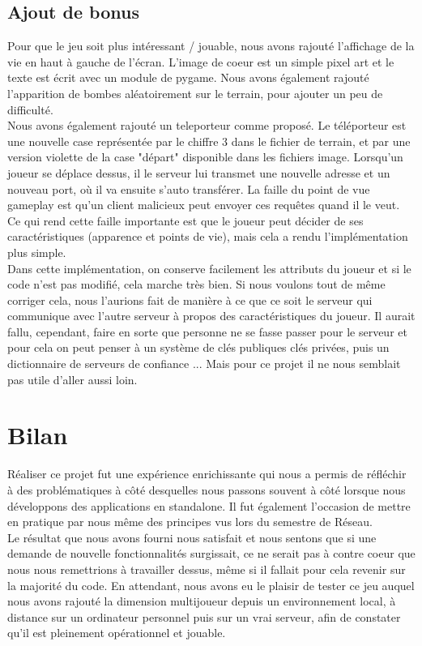 \documentclass[12pt]{article}
\begin{document}
\subsection{Ajout de bonus}
Pour que le jeu soit plus intéressant / jouable, nous avons rajouté l'affichage de la vie en haut à gauche de l'écran. L'image de coeur est un simple pixel art et le texte est écrit avec un module de pygame. Nous avons également rajouté l'apparition de bombes aléatoirement sur le terrain, pour ajouter un peu de difficulté. 
\\

Nous avons également rajouté un teleporteur comme proposé. Le téléporteur est une nouvelle case représentée par le chiffre 3 dans le fichier de terrain, et par une version violette de la case "départ" disponible dans les fichiers image. Lorsqu'un joueur se déplace dessus, il le serveur lui transmet une nouvelle adresse et un nouveau port, où il va ensuite s'auto transférer. La faille du point de vue gameplay est qu'un client malicieux peut envoyer ces requêtes quand il le veut. Ce qui rend cette faille importante est que le joueur peut décider de ses caractéristiques (apparence et points de vie), mais cela a rendu l'implémentation plus simple.
\\

Dans cette implémentation, on conserve facilement les attributs du joueur et si le code n'est pas modifié, cela marche très bien. Si nous voulons tout de même corriger cela, nous l'aurions fait de manière à ce que ce soit le serveur qui communique avec l'autre serveur à propos des caractéristiques du joueur. Il aurait fallu, cependant, faire en sorte que personne ne se fasse passer pour le serveur et pour cela on peut penser à un système de clés publiques clés privées, puis un dictionnaire de serveurs de confiance ... Mais pour ce projet il ne nous semblait pas utile d'aller aussi loin.
\newpage

\section{Bilan}
Réaliser ce projet fut une expérience enrichissante qui nous a permis de réfléchir à des problématiques à côté desquelles nous passons souvent à côté lorsque nous développons des applications en standalone. Il fut également l'occasion de mettre en pratique par nous même des principes vus lors du semestre de Réseau.
\\

Le résultat que nous avons fourni nous satisfait et nous sentons que si une demande de nouvelle fonctionnalités surgissait, ce ne serait pas à contre coeur que nous nous remettrions à travailler dessus, même si il fallait pour cela revenir sur la majorité du code. En attendant, nous avons eu le plaisir de tester ce jeu auquel nous avons rajouté la dimension multijoueur depuis un environnement local, à distance sur un ordinateur personnel puis sur un vrai serveur, afin de constater qu'il est pleinement opérationnel et jouable.
\end{document}

